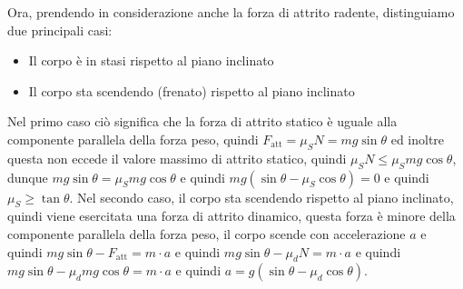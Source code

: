         Ora, prendendo in considerazione anche la forza di attrito radente, distinguiamo due principali casi:
        \begin{itemize}
            \item Il corpo è in stasi rispetto al piano inclinato
            \item Il corpo sta scendendo (frenato) rispetto al piano inclinato
        \end{itemize}
        Nel primo caso ciò significa che la forza di attrito statico è uguale alla componente parallela della forza peso, quindi $F_{\text{att}} = \mu_S N = mg\sin \theta$ ed inoltre questa non eccede il valore massimo di attrito statico, quindi $\mu_S N \leq \mu_S mg\cos \theta$, dunque $mg\sin \theta = \mu_S mg\cos \theta$ e quindi $ mg(\sin \theta - \mu_S \cos \theta) = 0$ e quindi $\mu_S \geq \tan \theta$.\newline
        Nel secondo caso, il corpo sta scendendo rispetto al piano inclinato, quindi viene esercitata una forza di attrito dinamico, questa forza è minore della componente parallela della forza peso, il corpo scende con accelerazione $a$ e quindi $mg\sin \theta - F_{\text{att}} = m\cdot a$ e quindi $mg\sin \theta - \mu_d N = m\cdot a$ e quindi $mg\sin \theta - \mu_d mg\cos \theta = m\cdot a$ e quindi $a = g(\sin \theta - \mu_d \cos \theta)$.